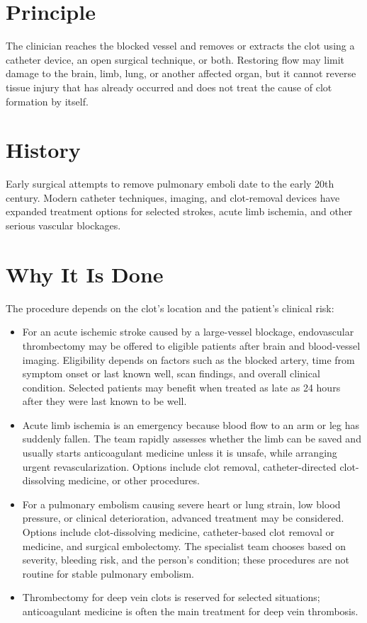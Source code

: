 \section*{Principle}
The clinician reaches the blocked vessel and removes or extracts the clot using a catheter device, an open surgical technique, or both. Restoring flow may limit damage to the brain, limb, lung, or another affected organ, but it cannot reverse tissue injury that has already occurred and does not treat the cause of clot formation by itself.

\section*{History}
Early surgical attempts to remove pulmonary emboli date to the early 20th century. Modern catheter techniques, imaging, and clot-removal devices have expanded treatment options for selected strokes, acute limb ischemia, and other serious vascular blockages.

\section*{Why It Is Done}
The procedure depends on the clot's location and the patient's clinical risk:
\begin{itemize}
  \item For an acute ischemic stroke caused by a large-vessel blockage, endovascular thrombectomy may be offered to eligible patients after brain and blood-vessel imaging. Eligibility depends on factors such as the blocked artery, time from symptom onset or last known well, scan findings, and overall clinical condition. Selected patients may benefit when treated as late as 24 hours after they were last known to be well.
  \item Acute limb ischemia is an emergency because blood flow to an arm or leg has suddenly fallen. The team rapidly assesses whether the limb can be saved and usually starts anticoagulant medicine unless it is unsafe, while arranging urgent revascularization. Options include clot removal, catheter-directed clot-dissolving medicine, or other procedures.
  \item For a pulmonary embolism causing severe heart or lung strain, low blood pressure, or clinical deterioration, advanced treatment may be considered. Options include clot-dissolving medicine, catheter-based clot removal or medicine, and surgical embolectomy. The specialist team chooses based on severity, bleeding risk, and the person's condition; these procedures are not routine for stable pulmonary embolism.
  \item Thrombectomy for deep vein clots is reserved for selected situations; anticoagulant medicine is often the main treatment for deep vein thrombosis.
\end{itemize}

